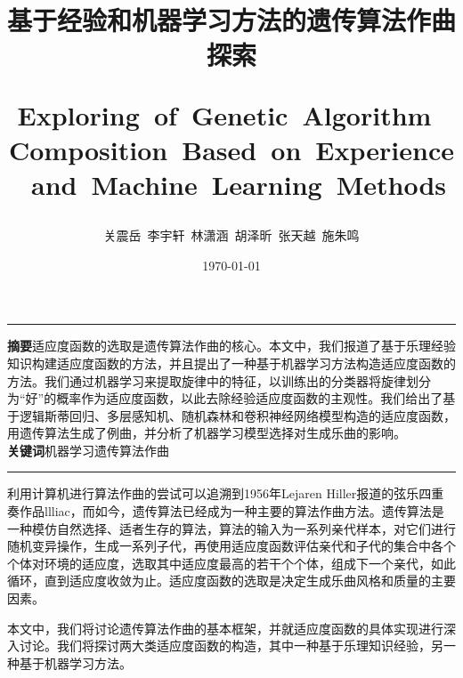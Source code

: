 \documentclass[UTF8,a4paper,10pt]{ctexart}
\title{\textcolor[rgb]{0,0.3,0.6}{\textbf{基于经验和机器学习方法的遗传算法作曲探索 }\\ [2ex] \begin{large} Exploring\  of\  Genetic\  Algorithm\  Composition\  Based\  on\  Experience\ and\ Machine\  Learning\ Methods\end{large}}}
\author{关震岳\  李宇轩\  林潇涵\  胡泽昕\  张天越\  施朱鸣}
\date{\today}
\begin{document}
    \maketitle


    \noindent \rule{\textwidth}{.625mm}
    \textbf{摘要}\quad 适应度函数的选取是遗传算法作曲的核心。本文中，我们报道了基于乐理经验知识构建适应度函数的方法，并且提出了一种基于机器学习方法构造适应度函数的方法。我们通过机器学习来提取旋律中的特征，以训练出的分类器将旋律划分为“好”的概率作为适应度函数，以此去除经验适应度函数的主观性。我们给出了基于逻辑斯蒂回归、多层感知机、随机森林和卷积神经网络模型构造的适应度函数，用遗传算法生成了例曲，并分析了机器学习模型选择对生成乐曲的影响。\\
    \textbf{关键词}\quad 机器学习\quad 遗传算法\quad 作曲\\
    \rule{\textwidth}{.625mm}
    \vspace*{.5cm}

    利用计算机进行算法作曲的尝试可以追溯到1956年Lejaren Hiller报道的弦乐四重奏作品llliac，而如今，遗传算法已经成为一种主要的算法作曲方法。遗传算法是一种模仿自然选择、适者生存的算法，算法的输入为一系列亲代样本，对它们进行随机变异操作，生成一系列子代，再使用适应度函数评估亲代和子代的集合中各个个体对环境的适应度，选取其中适应度最高的若干个个体，组成下一个亲代，如此循环，直到适应度收敛为止。适应度函数的选取是决定生成乐曲风格和质量的主要因素。\par
    本文中，我们将讨论遗传算法作曲的基本框架，并就适应度函数的具体实现进行深入讨论。我们将探讨两大类适应度函数的构造，其中一种基于乐理知识经验，另一种基于机器学习方法。
\end{document}
